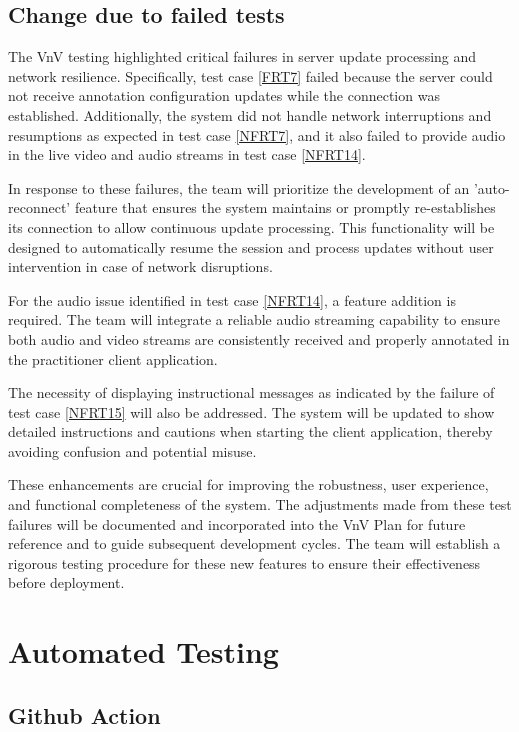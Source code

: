 \documentclass[12pt, titlepage]{article}
\begin{document}
\subsection{Change due to failed tests}

The VnV testing highlighted critical failures in server update processing and
network resilience. Specifically, test case \ref{FRT7} failed because the server
could not receive annotation configuration updates while the connection was
established. Additionally, the system did not handle network interruptions and
resumptions as expected in test case \ref{NFRT7}, and it also failed to provide
audio in the live video and audio streams in test case \ref{NFRT14}.

In response to these failures, the team will prioritize the development of an
'auto-reconnect' feature that ensures the system maintains or promptly
re-establishes its connection to allow continuous update processing. This
functionality will be designed to automatically resume the session and process
updates without user intervention in case of network disruptions.

For the audio issue identified in test case \ref{NFRT14}, a feature addition is
required. The team will integrate a reliable audio streaming capability to
ensure both audio and video streams are consistently received and properly
annotated in the practitioner client application.

The necessity of displaying instructional messages as indicated by the failure
of test case \ref{NFRT15} will also be addressed. The system will be updated to
show detailed instructions and cautions when starting the client application,
thereby avoiding confusion and potential misuse.

These enhancements are crucial for improving the robustness, user experience,
and functional completeness of the system. The adjustments made from these test
failures will be documented and incorporated into the VnV Plan for future
reference and to guide subsequent development cycles. The team will establish a
rigorous testing procedure for these new features to ensure their effectiveness
before deployment.

\section{Automated Testing}

\subsection{Github Action}
\end{document}
